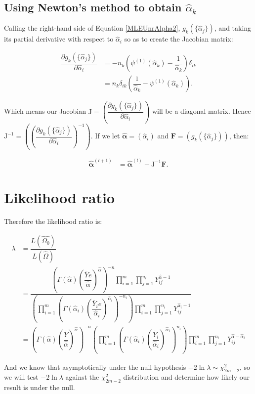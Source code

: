 \documentclass[12pt,a4paper,openright]{article}
\newcommand{\eqn}[1]{Equation \ref{#1}}
\newcommand{\ovY}{\overline{Y}}
\newcommand{\wal}{\widehat{\alpha}}
\begin{document}
	\subsection{Using Newton's method to obtain $\wal_k$}
	Calling the right-hand side of \eqn{MLEUnrAlpha2}, $g_k(\{\wal_j\})$, and taking its partial derivative with respect to $\wal_i$ so as to create the Jacobian matrix:
	
	\begin{align*}
		\dfrac{\partial g_k(\{\wal_j\})}{\partial \wal_i} &= -n_k \left(\psi^{(1)}(\wal_k) - \dfrac{1}{\wal_k}\right)\delta_{ik} \\
		&= n_k \delta_{ik} \left(\dfrac{1}{\wal_k} - \psi^{(1)}(\wal_k)\right).
	\end{align*}

	Which means our Jacobian $\mathrm{J}=\left(\dfrac{\partial g_k(\{\wal_j\})}{\partial \wal_i}\right)$ will be a diagonal matrix. Hence $\mathrm{J}^{-1} = \left(\left(\dfrac{\partial g_k(\{\wal_j\})}{\partial \wal_i}\right)^{-1}\right)$. If we let $\boldsymbol{\wal} = (\wal_i)$ and $\mathbf{F} = (g_k(\{\wal_j\}))$, then:
	
	\begin{align*}
		\boldsymbol{\wal}^{(l+1)} &= \boldsymbol{\wal}^{(l)} - \mathrm{J}^{-1}\mathbf{F}.
	\end{align*}

	\section{Likelihood ratio}
	Therefore the likelihood ratio is:
	
	\begin{align*}
		\lambda &= \dfrac{L(\widehat{\Omega_0})}{L(\widehat{\Omega})} \\
		&= \dfrac{\left(\Gamma(\wal)\left(\dfrac{\ovY e}{\wal}\right)^{\wal}\right)^{-n} \prod_{i=1}^m \prod_{j=1}^{n_i} Y_{ij}^{\wal-1}}{\left(\prod_{i=1}^m\left(\Gamma(\wal_i)\left(\dfrac{\ovY_i e}{\wal_i}\right)^{\wal_i}\right)^{-n_i}\right) \prod_{i=1}^m \prod_{j=1}^{n_i} Y_{ij}^{\wal_i-1}} \\
		&= \left(\Gamma(\wal)\left(\dfrac{\ovY }{\wal}\right)^{\wal}\right)^{-n} \left(\prod_{i=1}^m\left(\Gamma(\wal_i)\left(\dfrac{\ovY_i }{\wal_i}\right)^{\wal_i}\right)^{n_i}\right)\prod_{i=1}^m \prod_{j=1}^{n_i} Y_{ij}^{\wal-\wal_i}
	\end{align*}

	And we know that asymptotically under the null hypothesis $-2\ln{\lambda} \sim \chi^2_{2m-2}$, so we will test $-2\ln{\lambda}$ against the $\chi^2_{2m-2}$ distribution and determine how likely our result is under the null.  
\end{document}
